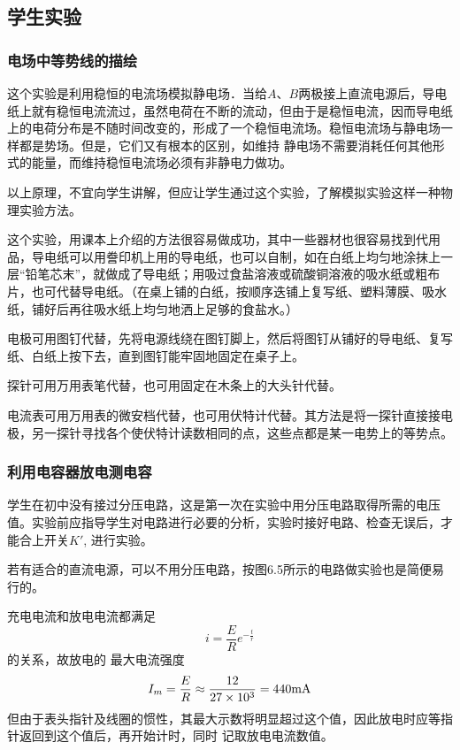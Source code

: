 \subsection{学生实验}
\subsubsection{电场中等势线的描绘}

这个实验是利用稳恒的电流场模拟静电场．当给$A$、$B$两极接上直流电源后，导电纸上就有稳恒电流流过，虽然电荷在不断的流动，但由于是稳恒电流，因而导电纸上的电荷分布是不随时间改变的，形成了一个稳恒电流场。稳恒电流场与静电场一样都是势场。但是，它们又有根本的区别，如维持
静电场不需要消耗任何其他形式的能量，而维持稳恒电流场必须有非静电力做功。

以上原理，不宜向学生讲解，但应让学生通过这个实验，了解模拟实验这样一种物理实验方法。

这个实验，用课本上介绍的方法很容易做成功，其中一些器材也很容易找到代用品，导电纸可以用誊印机上用的导电纸，也可以自制，如在白纸上均匀地涂抹上一层“铅笔芯末”，就做成了导电纸；用吸过食盐溶液或硫酸铜溶液的吸水纸或粗布片，也可代替导电纸。（在桌上铺的白纸，按顺序迭铺上复写纸、塑料薄膜、吸水纸，铺好后再往吸水纸上均匀地洒上足够的食盐水。）

电极可用图钉代替，先将电源线绕在图钉脚上，然后将图钉从铺好的导电纸、复写纸、白纸上按下去，直到图钉能牢固地固定在桌子上。

探针可用万用表笔代替，也可用固定在木条上的大头针代替。

电流表可用万用表的微安档代替，也可用伏特计代替。其方法是将一探针直接接电极，另一探针寻找各个使伏特计读数相同的点，这些点都是某一电势上的等势点。

\subsubsection{利用电容器放电测电容}

学生在初中没有接过分压电路，这是第一次在实验中用分压电路取得所需的电压值。实验前应指导学生对电路进行必要的分析，实验时接好电路、检查无误后，才能合上开关$K'$, 进行实验。

若有适合的直流电源，可以不用分压电路，按图6.5所示的电路做实验也是简便易行的。

\begin{figure}[htp]
    \centering
    \caption{}
\end{figure}

充电电流和放电电流都满足
\[i=\frac{E}{R}e^{-\frac{t}{r}}\]的关系，故放电的
最大电流强度
\[I_m=\frac{E}{R}\approx \frac{12}{ 27\times10^3}=440{\rm mA}\]但由于表头指针及线圈的惯性，其最大示数将明显超过这个值，因此放电时应等指针返回到这个值后，再开始计时，同时
记取放电电流数值。

